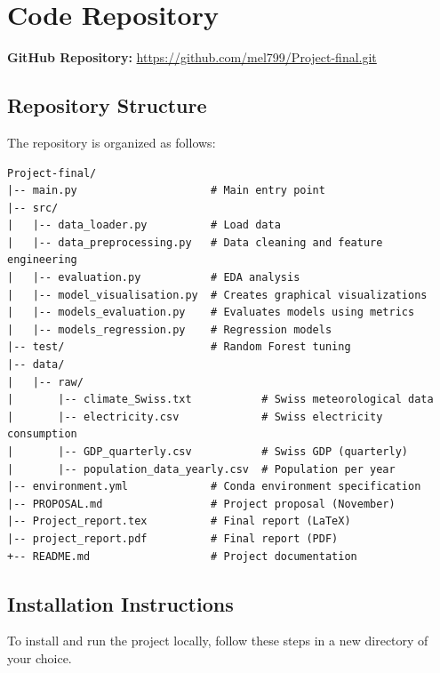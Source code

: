 \documentclass[11pt,a4paper]{article}
\begin{document}
\section{Code Repository}
\label{app:code}

\noindent
\textbf{GitHub Repository:} \url{https://github.com/mel799/Project-final.git}

\subsection{Repository Structure}

The repository is organized as follows:

\begin{small}
\begin{verbatim}
Project-final/
|-- main.py                     # Main entry point
|-- src/
|   |-- data_loader.py          # Load data
|   |-- data_preprocessing.py   # Data cleaning and feature engineering
|   |-- evaluation.py           # EDA analysis
|   |-- model_visualisation.py  # Creates graphical visualizations
|   |-- models_evaluation.py    # Evaluates models using metrics
|   |-- models_regression.py    # Regression models
|-- test/                       # Random Forest tuning
|-- data/
|   |-- raw/
|       |-- climate_Swiss.txt           # Swiss meteorological data
|       |-- electricity.csv             # Swiss electricity consumption
|       |-- GDP_quarterly.csv           # Swiss GDP (quarterly)
|       |-- population_data_yearly.csv  # Population per year
|-- environment.yml             # Conda environment specification
|-- PROPOSAL.md                 # Project proposal (November)
|-- Project_report.tex          # Final report (LaTeX)
|-- project_report.pdf          # Final report (PDF)
+-- README.md                   # Project documentation
\end{verbatim}
\end{small}

\subsection{Installation Instructions}

To install and run the project locally, follow these steps in a new directory of your choice.
\end{document}
